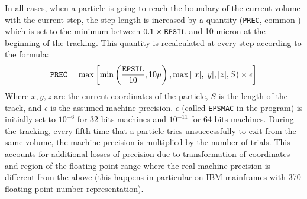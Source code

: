 In all cases, when a particle is going to reach the
boundary of the current volume with the current step, the step length is 
increased by a quantity ({\tt PREC}, common ) which is set to the 
minimum between $0.1 \times {\tt EPSIL}$
and 10 micron at the beginning of the tracking. This quantity is recalculated
at every step according to the formula:
\begin{equation}
\mbox{\tt PREC} 
=\max \left [ \min \left(\frac{\mbox{\tt EPSIL}}{10}, 10 \mu \right ) ,
\max \left [ | x |, | y |, | z |, S \right ) \times \epsilon \right ]
\end{equation}
Where $x, y, z$ are the current coordinates of the particle, $S$ is the length
of the track, and $\epsilon$ is the assumed machine precision.
$\epsilon$ (called {\tt EPSMAC} in the program) is initially set to
$10^{-6}$ for 32 bits machines and $10^{-11}$ for 64 bits machines.
During the tracking, every fifth time that a particle tries unsuccessfully
to exit from the same volume, the machine precision is multiplied by the
number of trials. This accounts for additional losses of precision due to
transformation of coordinates and region of the floating point range where
the real machine precision is different from the above (this happens 
in particular on IBM mainframes with 370 floating point number representation).
